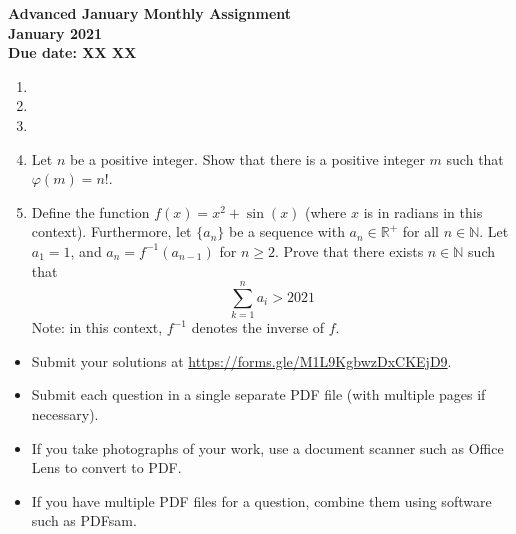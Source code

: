 \documentclass{article}
\begin{document}
\thispagestyle{empty}

\begin{center}
  \textbf{\Large Advanced January Monthly Assignment}
  \\ \vspace{1em}
  \textbf{\large January 2021}
  \\ \vspace{1em}
  \textbf{\large Due date: XX XX}
\end{center}

\vspace{12pt}

\begin{enumerate}[1.]

\item %

\item %


\item %


\item %
Let $n$ be a positive integer. Show that there is a positive integer $m$ such that $\varphi(m) = n!$.


\item %
Define the function $f(x) = x^2 + \sin(x)$ (where $x$ is in radians in this context). Furthermore, let $\{a_n\}$ be a sequence with $a_n \in \mathbb{R}^+$ for all $n \in \mathbb{N}$. Let $a_1 = 1$, and $a_n = f^{-1}(a_{n - 1})$ for $n \ge 2$. Prove that there exists $n \in \mathbb{N}$ such that 
$$\sum_{k = 1}^n a_i > 2021 $$
Note: in this context, $f^{-1}$ denotes the inverse of $f$.

\end{enumerate}


\vfill
\begin{itemize}
	\item Submit your solutions at \url{https://forms.gle/M1L9KgbwzDxCKEjD9}.
	\item Submit each question in a single separate PDF file (with multiple pages if necessary).
	\item If you take photographs of your work, use a document scanner such as Office Lens to convert to PDF.
	\item If you have multiple PDF files for a question, combine them using software such as PDFsam.
\end{itemize}

\vfill
\centering
\tiny
\begin{BVerbatim}
\end{BVerbatim}
\end{document}
